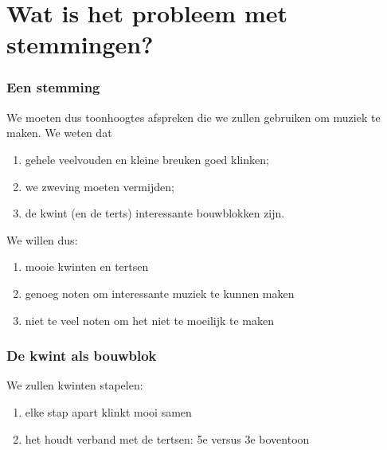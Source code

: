 \documentclass[compress, darktitle, framenumber, totalframenumber]{beamer}
\begin{document}
\section{Wat is het probleem met stemmingen?}

\begin{frame}
  \frametitle{Een stemming}

  We moeten dus toonhoogtes afspreken die we zullen gebruiken om muziek te maken. We weten dat
  \begin{enumerate}
    \item gehele veelvouden en kleine breuken goed klinken;
    \item we zweving moeten vermijden;
    \item de kwint (en de terts) interessante bouwblokken zijn.
  \end{enumerate}
  \pause
  We willen dus:
  \begin{enumerate}
    \item mooie kwinten en tertsen
    \item genoeg noten om interessante muziek te kunnen maken
    \item niet te veel noten om het niet te moeilijk te maken
  \end{enumerate}
\end{frame}

\begin{frame}
  \frametitle{De kwint als bouwblok}

  We zullen kwinten stapelen:
  \begin{enumerate}
    \item elke stap apart klinkt mooi samen
    \item het houdt verband met de tertsen: 5e versus 3e boventoon
  \end{enumerate}
\end{frame}
\end{document}
